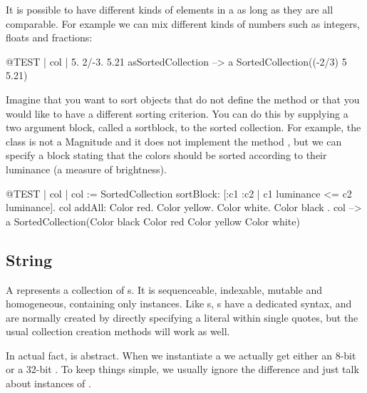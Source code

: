 \documentclass[a4paper,10pt,twoside]{book}
\begin{document}
It is possible to have different kinds of elements in a  as long as they are all comparable. For example we can mix different kinds of numbers such as integers, floats and fractions:
\begin{code}{@TEST | col |}
{ 5. 2/-3. 5.21 } asSortedCollection --> a SortedCollection((-2/3) 5 5.21)
\end{code}

Imagine that you want to sort objects that do not define the method \ct{<=} or that you would like to have a different sorting criterion. You can do this by supplying a two argument block, called a sortblock, to the sorted collection. For example, the class  is not a Magnitude and it does not implement the method \ct{<=}, but we can specify a block stating that the colors should be sorted according to their luminance (a measure of brightness).

\begin{code}{@TEST | col |}
col := SortedCollection sortBlock: [:c1 :c2 | c1 luminance <= c2 luminance].
col addAll: { Color red. Color yellow. Color white. Color black }.
col --> a SortedCollection(Color black Color red Color yellow Color white)
\end{code}

\subsection{String}
A \st {} represents a collection of s.
It is sequenceable, indexable, mutable and homogeneous, containing only  instances.
Like s, s have a dedicated syntax, and are normally created by directly specifying a  literal within single quotes, but the usual collection creation methods will work as well.


In actual fact,  is abstract.
When we instantiate a  we actually get either an 8-bit  or a 32-bit .
To keep things simple, we usually ignore the difference and just talk about instances of .
\end{document}
